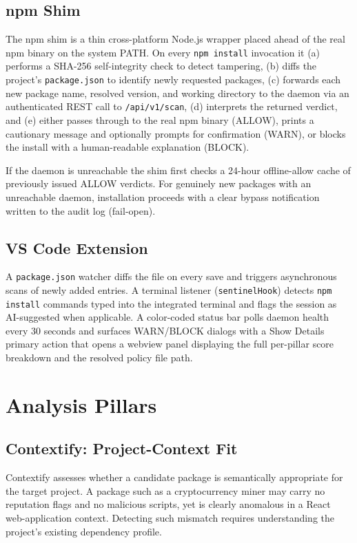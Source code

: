 \documentclass[journal]{IEEEtran}
\begin{document}
\subsection{npm Shim}
The npm shim is a thin cross-platform Node.js wrapper placed ahead of the real npm binary on the system
PATH. On every \texttt{npm install} invocation it (a) performs a SHA-256 self-integrity check to detect
tampering, (b) diffs the project's \texttt{package.json} to identify newly requested packages, (c) forwards
each new package name, resolved version, and working directory to the daemon via an authenticated REST call
to \texttt{/api/v1/scan}, (d) interprets the returned verdict, and (e) either passes through to the real npm
binary (ALLOW), prints a cautionary message and optionally prompts for confirmation (WARN), or blocks the
install with a human-readable explanation (BLOCK).

If the daemon is unreachable the shim first checks a 24-hour offline-allow cache of previously issued ALLOW
verdicts. For genuinely new packages with an unreachable daemon, installation proceeds with a clear bypass
notification written to the audit log (fail-open).

\subsection{VS Code Extension}
A \texttt{package.json} watcher diffs the file on every save and triggers asynchronous scans of newly added
entries. A terminal listener (\texttt{sentinelHook}) detects \texttt{npm install} commands typed into the
integrated terminal and flags the session as AI-suggested when applicable. A color-coded status bar polls
daemon health every 30 seconds and surfaces WARN/BLOCK dialogs with a Show Details primary action that opens
a webview panel displaying the full per-pillar score breakdown and the resolved policy file path.

\section{Analysis Pillars}

\subsection{Contextify: Project-Context Fit}
Contextify assesses whether a candidate package is semantically appropriate for the target project. A
package such as a cryptocurrency miner may carry no reputation flags and no malicious scripts, yet is
clearly anomalous in a React web-application context. Detecting such mismatch requires understanding the
project's existing dependency profile.
\end{document}
